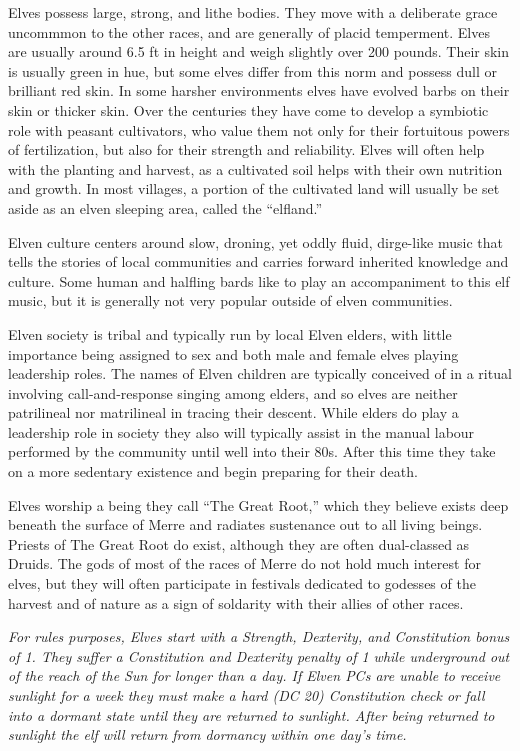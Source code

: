 \documentclass[paper=a4, fontsize=11pt]{scrartcl} %
\begin{document}
\begin{multicols}{2}
Elves possess large, strong, and lithe bodies. They move with a deliberate grace uncommmon to the other races, and are generally of placid temperment. Elves are usually around 6.5 ft in height and weigh slightly over 200 pounds. Their skin is usually green in hue, but some elves differ from this norm and possess dull or brilliant red skin. In some harsher environments elves have evolved barbs on their skin or thicker skin. Over the centuries they have come to develop a symbiotic role with peasant cultivators, who value them not only for their fortuitous powers of fertilization, but also for their strength and reliability. Elves will often help with the planting and harvest, as a cultivated soil helps with their own nutrition and growth. In most villages, a portion of the cultivated land will usually be set aside as an elven sleeping area, called the ``elfland.''

Elven culture centers around slow, droning, yet oddly fluid, dirge-like music that tells the stories of local communities and carries forward inherited knowledge and culture. Some human and halfling bards like to play an accompaniment to this elf music, but it is generally not very popular outside of elven communities.

Elven society is tribal and typically run by local Elven elders, with little importance being assigned to sex and both male and female elves playing leadership roles. The names of Elven children are typically conceived of in a ritual involving call-and-response singing among elders, and so elves are neither patrilineal nor matrilineal in tracing their descent. While elders do play a leadership role in society they also will typically assist in the manual labour performed by the community until well into their 80s. After this time they take on a more sedentary existence and begin preparing for their death.

Elves worship a being they call ``The Great Root,'' which they believe exists deep beneath the surface of Merre and radiates sustenance out to all living beings. Priests of The Great Root do exist, although they are often dual-classed as Druids. The gods of most of the races of Merre do not hold much interest for elves, but they will often participate in festivals dedicated to godesses of the harvest and of nature as a sign of soldarity with their allies of other races.

\textit{For rules purposes, Elves start with a Strength, Dexterity, and Constitution bonus of 1. They suffer a Constitution and Dexterity penalty of 1 while underground out of the reach of the Sun for longer than a day. If Elven PCs are unable to receive sunlight for a week they must make a hard (DC 20) Constitution check or fall into a dormant state until they are returned to sunlight. After being returned to sunlight the elf will return from dormancy within one day's time.}


\end{multicols}
\end{document}

